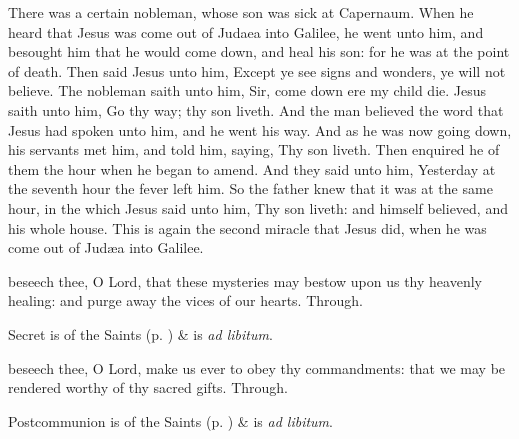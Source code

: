 
 There was a certain nobleman, whose son was sick at Capernaum. When he heard that Jesus was come out of Judaea into Galilee, he went unto him, and besought him that he would come down, and heal his son: for he was at the point of death. Then said Jesus unto him, Except ye see signs and wonders, ye will not believe. The nobleman saith unto him, Sir, come down ere my child die. Jesus saith unto him, Go thy way; thy son liveth. And the man believed the word that Jesus had spoken unto him, and he went his way. And as he was now going down, his servants met him, and told him, saying, Thy son liveth. Then enquired he of them the hour when he began to amend. And they said unto him, Yesterday at the seventh hour the fever left him. So the father knew that it was at the same hour, in the which Jesus said unto him, Thy son liveth: and himself believed, and his whole house. This is again the second miracle that Jesus did, when he was come out of Jud{\ae}a into Galilee.


\secret
{} beseech thee, O Lord, that these mysteries may bestow upon us thy heavenly healing: and purge away the vices of our hearts. Through.
\begin{rubric}
     Secret is of the Saints (p. \pageref{SPSaints}) \&  is \emph{ad libitum}.
\end{rubric}


\postcommunion
{} beseech thee, O Lord, make us ever to obey thy commandments: that we may be rendered worthy of thy sacred gifts. Through.
\begin{rubric}
     Postcommunion is of the Saints (p. \pageref{SPSaints}) \&  is \emph{ad libitum}.
\end{rubric}

